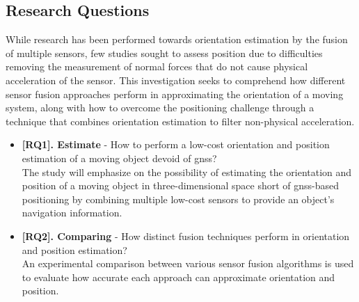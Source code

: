 

\subsection{Research Questions}
While research has been performed towards orientation estimation by the fusion of multiple sensors, few studies sought to assess position due to difficulties removing the measurement of normal forces that do not cause physical acceleration of the sensor. This investigation seeks to comprehend how different sensor fusion approaches perform in approximating the orientation of a moving system, along with how to overcome the positioning challenge through a technique that combines orientation estimation to filter non-physical acceleration.

\begin{itemize}
      \item \textbf{[RQ1]. Estimate} - How to perform a low-cost orientation and position estimation of a moving object devoid of \acrshort{gnss}?\\
            The study will emphasize on the possibility of estimating the orientation and position of a moving object in three-dimensional space short of \acrshort{gnss}-based positioning by combining multiple low-cost sensors to provide an object's navigation information.
      \item \textbf{[RQ2]. Comparing} - How distinct fusion techniques perform in orientation and position estimation? \\
            An experimental comparison between various sensor fusion algorithms is used to evaluate how accurate each approach can approximate orientation and position.

\end{itemize}